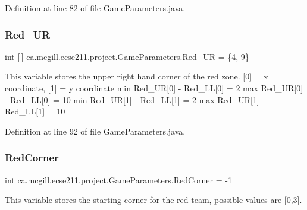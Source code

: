 Definition at line 82 of file Game\+Parameters.\+java.

\mbox{\label{classca_1_1mcgill_1_1ecse211_1_1project_1_1_game_parameters_a81ddd789119962c32fe6d7f9cce4f240}} 
\subsubsection{\texorpdfstring{Red\+\_\+\+UR}{Red\_UR}}
{\footnotesize\ttfamily int \mbox{[}$\,$\mbox{]} ca.\+mcgill.\+ecse211.\+project.\+Game\+Parameters.\+Red\+\_\+\+UR = \{4, 9\}\hspace{0.3cm}{\ttfamily [static]}}

This variable stores the upper right hand corner of the red zone. \mbox{[}0\mbox{]} = x coordinate, \mbox{[}1\mbox{]} = y coordinate min Red\+\_\+\+UR\mbox{[}0\mbox{]} -\/ Red\+\_\+\+LL\mbox{[}0\mbox{]} = 2 max Red\+\_\+\+UR\mbox{[}0\mbox{]} -\/ Red\+\_\+\+LL\mbox{[}0\mbox{]} = 10 min Red\+\_\+\+UR\mbox{[}1\mbox{]} -\/ Red\+\_\+\+LL\mbox{[}1\mbox{]} = 2 max Red\+\_\+\+UR\mbox{[}1\mbox{]} -\/ Red\+\_\+\+LL\mbox{[}1\mbox{]} = 10 

Definition at line 92 of file Game\+Parameters.\+java.

\mbox{\label{classca_1_1mcgill_1_1ecse211_1_1project_1_1_game_parameters_acf0dce5eb9dc754248f0c3de997d2809}} 
\subsubsection{\texorpdfstring{Red\+Corner}{RedCorner}}
{\footnotesize\ttfamily int ca.\+mcgill.\+ecse211.\+project.\+Game\+Parameters.\+Red\+Corner = -\/1\hspace{0.3cm}{\ttfamily [static]}}

This variable stores the starting corner for the red team, possible values are \mbox{[}0,3\mbox{]}. 

